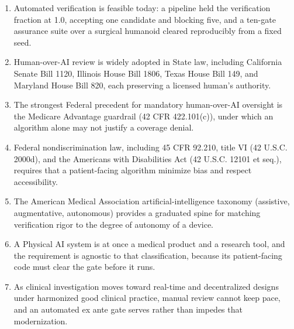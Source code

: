 \begin{enumerate}[leftmargin=2.0em,itemsep=2pt,topsep=2pt,label=(\arabic*)]
15066 supply the dispersion bounds, fail-safe requirements, and biomechanical
contact limits to which such a gate may be bound.
\item Automated verification is feasible today: a pipeline held the verification
fraction at 1.0, accepting one candidate and blocking five, and a ten-gate
assurance suite over a surgical humanoid cleared reproducibly from a fixed seed.
\item Human-over-AI review is widely adopted in State law, including California
Senate Bill 1120, Illinois House Bill 1806, Texas House Bill 149, and Maryland
House Bill 820, each preserving a licensed human's authority.
\item The strongest Federal precedent for mandatory human-over-AI oversight is the
Medicare Advantage guardrail (42 CFR 422.101(c)), under which an algorithm alone may
not justify a coverage denial.
\item Federal nondiscrimination law, including 45 CFR 92.210, title VI (42 U.S.C.
2000d), and the Americans with Disabilities Act (42 U.S.C. 12101 et seq.), requires
that a patient-facing algorithm minimize bias and respect accessibility.
\item The American Medical Association artificial-intelligence taxonomy
(assistive, augmentative, autonomous) provides a graduated spine for matching
verification rigor to the degree of autonomy of a device.
\item A Physical AI system is at once a medical product and a research tool, and the
requirement is agnostic to that classification, because its patient-facing code must
clear the gate before it runs.
\item As clinical investigation moves toward real-time and decentralized designs
under harmonized good clinical practice, manual review cannot keep pace, and an
automated ex ante gate serves rather than impedes that modernization.
\end{enumerate}


